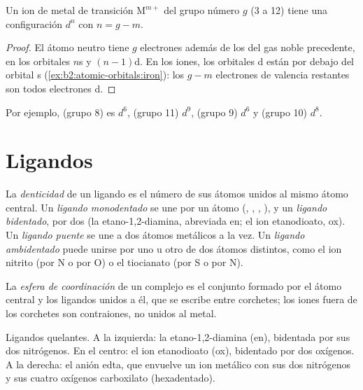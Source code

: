\begin{proposition}\label{prop:b2:coordination-complexes:dn}
Un ion de metal de transición $\mathrm M^{m+}$ del grupo número $g$ (3 a 12) tiene una configuración $d^n$
con $n = g - m$.
\end{proposition}

\begin{proof}
El átomo neutro tiene $g$ electrones además de los del gas noble precedente, en los orbitales $n$s y
$(n - 1)$d. En los iones, los orbitales d están por debajo del orbital s
(\cref{ex:b2:atomic-orbitals:iron}): los $g - m$ electrones de valencia restantes son todos
electrones d.
\end{proof}

Por ejemplo,  (grupo 8) es $d^6$,  (grupo 11) $d^9$,  (grupo 9)
$d^6$ y  (grupo 10) $d^8$.

\section{Ligandos}

\begin{definition}[Denticidad]\label{def:b2:coordination-complexes:denticity}
La \emph{denticidad} de un ligando es el número de sus átomos unidos al
mismo átomo central. Un \emph{ligando monodentado} se une
por un átomo (, , , ), y un \emph{ligando
bidentado}, por dos (la etano-1,2-diamina, abreviada en; el
ion etanodioato, ox). Un \emph{ligando puente} se une a dos
átomos metálicos a la vez. Un \emph{ligando ambidentado} puede unirse
por uno u otro de dos átomos distintos, como el ion nitrito (por N o por O) o el
tiocianato (por S o por N).
\end{definition}

\begin{definition}\label{def:b2:coordination-complexes:coordination-sphere}
La \emph{esfera de coordinación} de un complejo es el conjunto formado por
el átomo central y los ligandos unidos a él, que se escribe entre corchetes; los iones
fuera de los corchetes son contraiones, no unidos al metal.
\end{definition}

\begin{omfigure}
\qquad
{}
\qquad
{}

\medskip
{\small Ligandos quelantes. A la izquierda: la etano-1,2-diamina (en), bidentada por sus dos
nitrógenos. En el centro: el ion etanodioato (ox), bidentado por dos oxígenos. A la derecha:
el anión edta, que envuelve un ion metálico con sus dos nitrógenos y sus cuatro
oxígenos carboxilato (hexadentado).}
\end{omfigure}

